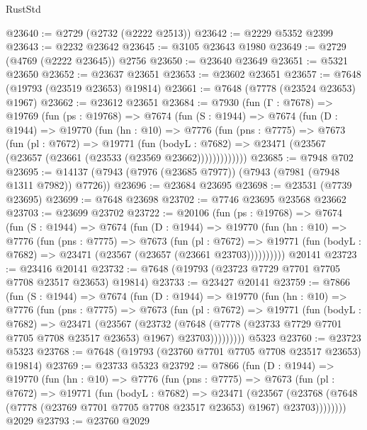 \begin{lexlean}{RustStd}
\begin{coremodule}
{\begin{coremodule}
{{{{{{{{{{{{{{{{{{{{{{{{{{{{{{{{{{{{{{{{{{{{{{{{{{{{{@23640 := @2729 (@2732 (@2222 @2513))
@23642 := @2229 @5352 @2399
@23643 := @2232 @23642
@23645 := @3105 @23643 @1980
@23649 := @2729 (@4769 (@2222 @23645)) @2756
@23650 := @23640 @23649
@23651 := @5321 @23650
@23652 := @23637 @23651
@23653 := @23602 @23651
@23657 := @7648 (@19793 (@23519 @23653) @19814)
@23661 := @7648 (@7778 (@23524 @23653) @1967)
@23662 := @23612 @23651
@23684 := @7930
    (fun (Γ : @7678) =>
    @19769
      (fun (ps : @19768) =>
      @7674
        (fun (S : @1944) =>
        @7674
          (fun (D : @1944) =>
          @19770
            (fun (hn : @10) =>
            @7776
              (fun (pns : @7775) =>
              @7673
                (fun (pl : @7672) =>
                @19771
                  (fun (bodyL : @7682) =>
                  @23471 (@23567 (@23657 (@23661 (@23533 (@23569 @23662)))))))))))))
@23685 := @7948 @702
@23695 := @14137 (@7943 (@7976 (@23685 @7977)) (@7943 (@7981 (@7948 @1311 @7982)) @7726))
@23696 := @23684 @23695
@23698 := @23531 (@7739 @23695)
@23699 := @7648 @23698
@23702 := @7746 @23695 @23568 @23662
@23703 := @23699 @23702
@23722 := @20106
    (fun (ps : @19768) =>
    @7674
      (fun (S : @1944) =>
      @7674
        (fun (D : @1944) =>
        @19770
          (fun (hn : @10) =>
          @7776
            (fun (pns : @7775) =>
            @7673
              (fun (pl : @7672) =>
              @19771 (fun (bodyL : @7682) => @23471 (@23567 (@23657 (@23661 @23703))))))))))
    @20141
@23723 := @23416 @20141
@23732 := @7648 (@19793 (@23723 @7729 @7701 @7705 @7708 @23517 @23653) @19814)
@23733 := @23427 @20141
@23759 := @7866
    (fun (S : @1944) =>
    @7674
      (fun (D : @1944) =>
      @19770
        (fun (hn : @10) =>
        @7776
          (fun (pns : @7775) =>
          @7673
            (fun (pl : @7672) =>
            @19771
              (fun (bodyL : @7682) =>
              @23471
                (@23567
                  (@23732
                    (@7648
                      (@7778 (@23733 @7729 @7701 @7705 @7708 @23517 @23653) @1967)
                      @23703)))))))))
    @5323
@23760 := @23723 @5323
@23768 := @7648 (@19793 (@23760 @7701 @7705 @7708 @23517 @23653) @19814)
@23769 := @23733 @5323
@23792 := @7866
    (fun (D : @1944) =>
    @19770
      (fun (hn : @10) =>
      @7776
        (fun (pns : @7775) =>
        @7673
          (fun (pl : @7672) =>
          @19771
            (fun (bodyL : @7682) =>
            @23471
              (@23567
                (@23768 (@7648 (@7778 (@23769 @7701 @7705 @7708 @23517 @23653) @1967) @23703))))))))
    @2029
@23793 := @23760 @2029
}}}}}}}}}}}}}}}}}}}}}}}}}}}}}}}}}}}}}}}}}}}}}}}}}}}}}
\end{coremodule}}
\end{coremodule}
\end{lexlean}
